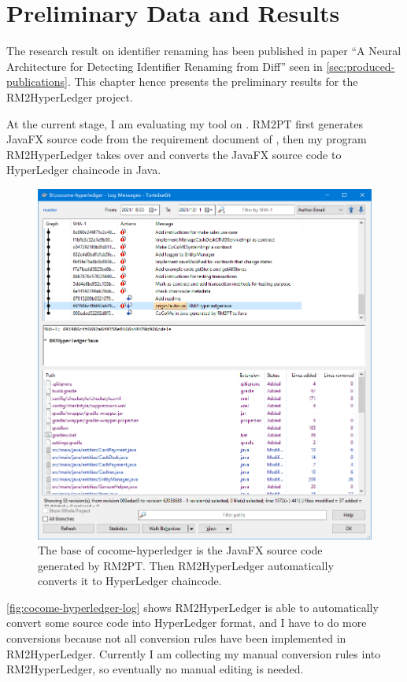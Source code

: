 \chapter{Preliminary Data and Results}

The research result on identifier renaming has been published in paper ``A Neural Architecture for Detecting Identifier Renaming from Diff'' seen in \autoref{sec:produced-publications}.
This chapter hence presents the preliminary results for the RM2HyperLedger project.

At the current stage, I am evaluating my tool on \cocome. RM2PT first generates JavaFX source code from the requirement document of \cocome, then my program RM2HyperLedger takes over and converts the JavaFX source code to HyperLedger chaincode in Java.

\begin{figure}[ht]
\centering
\includegraphics[width=0.9\linewidth]{cocome-hyperledger-log}
\caption{The base of cocome-hyperledger is the JavaFX source code generated by RM2PT. Then RM2HyperLedger automatically converts it to HyperLedger chaincode.}
\label{fig:cocome-hyperledger-log}
\end{figure}

\autoref{fig:cocome-hyperledger-log} shows RM2HyperLedger is able to automatically convert some source code into HyperLedger format, and I have to do more conversions because not all conversion rules have been implemented in RM2HyperLedger. Currently I am collecting my manual conversion rules into RM2HyperLedger, so eventually no manual editing is needed.

